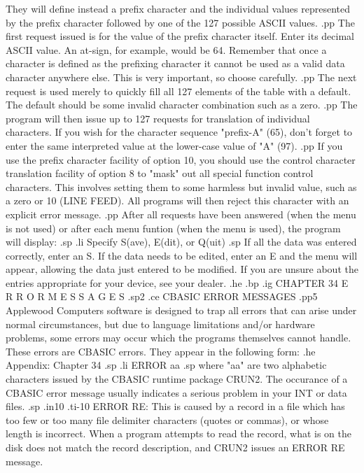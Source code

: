 They will define instead a prefix character and the individual values
represented by the prefix character followed by one of the 127 possible
ASCII values.
.pp
The first request issued is for the value of the prefix character itself.
Enter its decimal ASCII value.	An at-sign, for example, would be 64.
Remember that once a character is defined as the prefixing character it
cannot be used as a valid data character anywhere else.
This is very important, so choose carefully.
.pp
The next request is used merely to quickly fill all 127 elements of the
table with a default.	The default should be some invalid character
combination such as a zero.
.pp
The program will then issue up to 127 requests for translation of individual
characters.  If you wish for the character sequence "prefix-A" (65), don't
forget to enter the same interpreted value at the lower-case value of "A" (97).
.pp
If you use the prefix character facility of option 10, you should use the
control character translation facility of option 8 to "mask" out all special
function control characters.  This involves setting them to some harmless
but invalid value, such as a zero or 10 (LINE FEED).  All programs will
then reject this character with an explicit error message.
.pp
After all requests have been answered (when the menu is not used) or after
each menu funtion (when the menu is used), the program will display:
.sp
.li
	Specify S(ave), E(dit), or Q(uit)
.sp
If all the data was entered correctly, enter an S.  If the data needs
to be edited, enter an E and the menu will appear, allowing the
data just entered to be modified.  If you are unsure about the entries
appropriate for your device, see your dealer.
.he
.bp
.ig
CHAPTER 34
E R R O R    M E S S A G E S
.sp2
.ce
CBASIC ERROR MESSAGES
.pp5
Applewood Computers software is designed to trap all errors that can arise under
normal circumstances, but due to language limitations and/or hardware
problems, some errors may occur which the programs themselves cannot
handle.  These errors are CBASIC errors.  They appear in the following
form:
.he Appendix: Chapter 34
.sp
.li
		ERROR aa
.sp
where "aa" are two alphabetic characters issued by the CBASIC runtime
package CRUN2.	The occurance of a CBASIC error message usually
indicates a serious problem in your INT or data files.
.sp
.in10
.ti-10
ERROR RE: This is caused by a record in a file which has too few
or too many file delimiter characters (quotes or commas), or
whose length is incorrect.  When a program attempts to
read the record, what is on the disk does not match the record description,
and CRUN2 issues an ERROR RE message.
